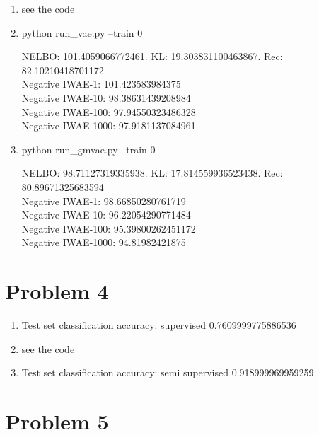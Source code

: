 \documentclass[12pt]{article}
\begin{document}
\begin{enumerate}
\item 
see the code

\item 
python run\_vae.py --train 0

NELBO: 101.4059066772461. KL: 19.303831100463867. Rec: 82.10210418701172 \\
Negative IWAE-1: 101.423583984375 \\
Negative IWAE-10: 98.38631439208984 \\
Negative IWAE-100: 97.94550323486328 \\
Negative IWAE-1000: 97.9181137084961 \\

\item
python run\_gmvae.py --train 0

NELBO: 98.71127319335938. KL: 17.814559936523438. Rec: 80.89671325683594 \\
Negative IWAE-1: 98.66850280761719 \\
Negative IWAE-10: 96.22054290771484 \\
Negative IWAE-100: 95.39800262451172 \\
Negative IWAE-1000: 94.81982421875 \\
	
	
\end{enumerate}

\section*{Problem 4}
\begin{enumerate}
	\item 
	Test set classification accuracy: supervised 0.7609999775886536
	
	\item 
	see the code
	
	\item 
	Test set classification accuracy: semi supervised 0.918999969959259
\end{enumerate}


\section*{Problem 5}
\end{document}
